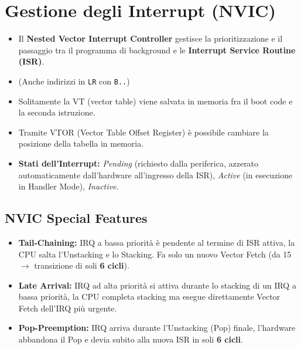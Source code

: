 \section{Gestione degli Interrupt (NVIC)}

\begin{itemize}
    \item Il \textbf{Nested Vector Interrupt Controller} gestisce la prioritizzazione e il passaggio tra il programma di background e le \textbf{Interrupt Service Routine (ISR)}.
    \item {} (Anche indirizzi in \texttt{LR} con \texttt{B..})
    \item Solitamente la VT (vector table) viene salvata in memoria fra il boot code e la seconda istruzione. 
    \item Tramite VTOR (Vector Table Offset Register) è possibile cambiare la posizione della tabella in memoria.
    \item \textbf{Stati dell'Interrupt:} \textit{Pending} (richiesto dalla periferica, azzerato automaticamente dall'hardware all'ingresso della ISR), \textit{Active} (in esecuzione in Handler Mode), \textit{Inactive}.
\end{itemize}

\subsection{NVIC Special Features}
\begin{itemize}
    \item \textbf{Tail-Chaining:} IRQ a bassa priorità è pendente al termine 
    di ISR attiva, la CPU salta l'Unstacking e lo Stacking. Fa solo un nuovo Vector Fetch 
    (da 15 $\rightarrow$ transizione di soli \textbf{6 cicli}).
    \item \textbf{Late Arrival:} IRQ ad alta priorità si attiva durante lo stacking 
    di un IRQ a bassa priorità, la CPU completa stacking ma esegue direttamente Vector Fetch dell'IRQ più urgente.
    \item \textbf{Pop-Preemption:} IRQ arriva durante l'Unstacking (Pop) finale, l'hardware abbandona il Pop e devia subito alla nuova ISR in soli \textbf{6 cicli}.
\end{itemize}\vspace{-1em}

